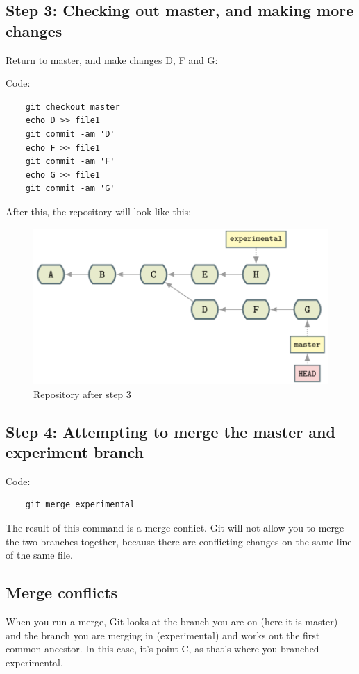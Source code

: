 \documentclass{report}
\begin{document}
\subsection{Step 3: Checking out master, and making more changes}

Return to master, and make changes D, F and G:

Code:

\begin{lstlisting}
    git checkout master
    echo D >> file1
    git commit -am 'D'
    echo F >> file1
    git commit -am 'F'
    echo G >> file1
    git commit -am 'G'
\end{lstlisting}

After this, the repository will look like this:

\begin{figure}[H]
    \centering
    \includegraphics[width=0.5 \linewidth]{Photos/merge-5.png}
    \caption[short]{Repository after step 3}
    \label{fig:merge-5}
\end{figure}

\subsection{Step 4: Attempting to merge the master and experiment branch}

Code:

\begin{lstlisting}
    git merge experimental
\end{lstlisting}

The result of this command is a merge conflict. Git will not allow you to merge the two branches together, because there are conflicting changes on the same line of the same file.

\subsection{Merge conflicts}

When you run a merge, Git looks at the branch you are on (here it is master) and the branch you are merging in (experimental) and works out the first common ancestor. In this case, it's point C, as that's where you branched experimental.
\end{document}
